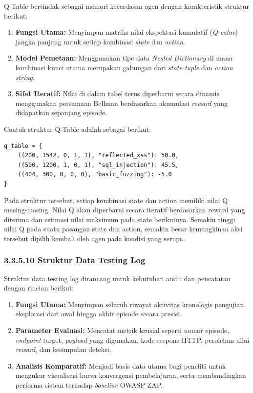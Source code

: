 Q-Table bertindak sebagai memori kecerdasan agen dengan karakteristik struktur berikut:

\begin{enumerate}
    \item \textbf{Fungsi Utama:} Menyimpan matriks nilai ekspektasi kumulatif (\textit{Q-value}) jangka panjang untuk setiap kombinasi \textit{state} dan \textit{action}.
    \item \textbf{Model Pemetaan:} Menggunakan tipe data \textit{Nested Dictionary} di mana kombinasi kunci utama merupakan gabungan dari \textit{state tuple} dan \textit{action string}.
    \item \textbf{Sifat Iteratif:} Nilai di dalam tabel terus diperbarui secara dinamis menggunakan persamaan Bellman berdasarkan akumulasi \textit{reward} yang didapatkan sepanjang episode.
\end{enumerate}

Contoh struktur Q-Table adalah sebagai berikut:

\begin{verbatim}
q_table = {
    ((200, 1542, 0, 1, 1), "reflected_xss"): 50.0,
    ((500, 1200, 1, 0, 1), "sql_injection"): 45.5,
    ((404, 300, 0, 0, 0), "basic_fuzzing"): -5.0
}
\end{verbatim}

Pada struktur tersebut, setiap kombinasi state dan action memiliki nilai Q masing-masing. Nilai Q akan diperbarui secara iteratif berdasarkan reward yang diterima dan estimasi nilai maksimum pada state berikutnya. Semakin tinggi nilai Q pada suatu pasangan state dan action, semakin besar kemungkinan aksi tersebut dipilih kembali oleh agen pada kondisi yang serupa.

\subsubsection{3.3.5.10 Struktur Data Testing Log}

Struktur data testing log dirancang untuk kebutuhan audit dan pencatatan dengan rincian berikut:

\begin{enumerate}
    \item \textbf{Fungsi Utama:} Menyimpan seluruh riwayat aktivitas kronologis pengujian eksplorasi dari awal hingga akhir episode secara presisi.
    \item \textbf{Parameter Evaluasi:} Mencatat metrik krusial seperti nomor episode, \textit{endpoint} target, \textit{payload} yang digunakan, kode respons HTTP, perolehan nilai \textit{reward}, dan kesimpulan deteksi.
    \item \textbf{Analisis Komparatif:} Menjadi basis data utama bagi peneliti untuk mengukur visualisasi kurva konvergensi pembelajaran, serta membandingkan performa sistem terhadap \textit{baseline} OWASP ZAP.
\end{enumerate}

